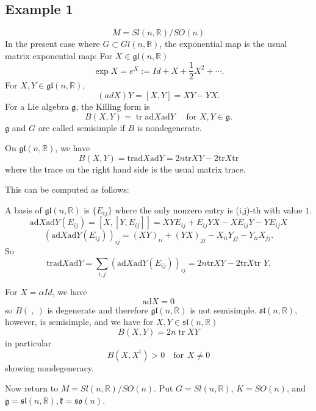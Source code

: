 \subsection{Example 1}
	\[
	M=Sl(n,\mathbb{R})/SO(n)
	\]
	In the present case where $G \subset G l(n, \mathbb{R})$, the
	exponential map is the usual matrix exponential map:
	For $X \in \mathfrak{gl}(n, \mathbb{R})$
	\[
	\exp X=e^{X}:={Id}+X+\frac{1}{2} X^{2}+\cdots.
	\]
	For $X, Y \in \mathfrak{gl}(n, \mathbb{R})$, 
	\[
	({ad} X) Y=[X, Y]=X Y-Y X.
	\]
	For a Lie algebra $\mathfrak{g}$, the Killing form is
	\[
	B(X, Y)=\operatorname{tr} \mathrm{ad} X \mathrm{ad} Y \quad
	\text { for } X, Y \in \mathfrak{g}.
	\]
	$\mathfrak{g}$ and $G$ are called semisimple if $B$ is
	nondegenerate.

	On $\mathfrak{gl}(n, \mathbb{R})$, we have 
	\[
	B(X,Y)=\text{tr}
	\mathrm{ad}X\mathrm{ad}Y=2n\text{tr}XY-2\text{tr}X\text{tr}
	\]
	where the trace on the right hand side is the usual matrix
	trace. 	

	This can be computed as follows: 
	
	 A basis of $\mathfrak{gl}(n,\mathbb{R})$ is $\{E_{ij}\}$
	 where the only nonzero entry is (i,j)-th with value $1$.
	\[\mathrm{ad}X
	\mathrm{ad}Y(E_{ij})=[X,[Y,E_{ij}]]=XYE_{ij}+E_{ij}YX-XE_{ij
	}Y-YE_{ij}X\]
	\[(\mathrm{ad}X
	\mathrm{ad}Y(E_{ij}))_{ij}=(XY)_{ii}+(YX)_{jj}-X_{ii}Y_{jj}-
	Y_{ii}X_{jj}.\]
	So
	\[\text{tr}\mathrm{ad}X\mathrm{ad}Y=\sum_{i,j}(\mathrm{ad}X
	\mathrm{ad}Y(E_{ij}))_{ij}=2n\text{tr}XY-2\text{tr}X\text{tr
	}Y.\]

	For $X=\alpha {Id}$, we have
	\[
	\mathrm{ad} X=0
	\]
	so $B(\ ,\ )$ is degenerate and therefore $\mathfrak{g l}(n,
	\mathbb{R})$ is not semisimple. $\mathfrak{sl}(n,
	\mathbb{R})$, however, is semisimple, and we have for $X, Y
	\in \mathfrak{sl}(n, \mathbb{R})$
	\[
	B(X, Y)=2 n \operatorname{tr} X Y
	\]
	in particular 
	\[
	B\left(X, X^{t}\right)>0 \quad \text{for}\ \  X \neq 0
	\]
	showing nondegeneracy.	

	
	Now return to $M=S l(n, \mathbb{R}) / S O(n)$.  Put $G=S l(n,
	\mathbb{R})$,
	$K=S O(n)$, and $\mathfrak{g}=\mathfrak{sl}(n, \mathbb{R}),
	\mathfrak{k}=\mathfrak{s o}(n)$. 
	
